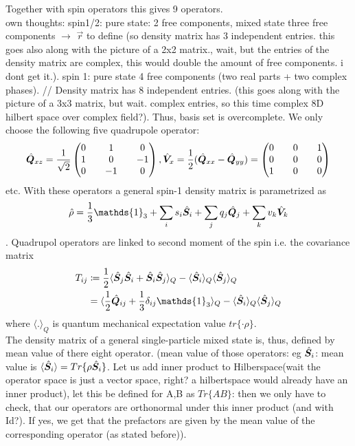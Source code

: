 Together with spin operators this gives 9 operators. 
\\
own thoughts: spin1/2: pure state: 2 free components, mixed state three free components $\rightarrow$ $\vec{r}$ to define (so density matrix has 3 independent entries. this goes also along with the picture of a 2x2 matrix., wait, but the entries of the density matrix are complex, this would double the amount of free components. i dont get it.). spin 1: pure state 4 free components (two real parts + two complex phases). 
//
Density matrix has 8 independent entries. (this goes along with the picture of a 3x3 matrix, but wait. complex entries, so this time complex 8D hilbert space over complex field?). Thus, basis set is overcomplete. We only choose the following five quadrupole operator:
\begin{equation}
	\hat{\bm{Q}}_{xz} = \frac{1}{\sqrt{2}} \left (
	\begin{matrix}
		0 && 1 && 0 
		\\
		1 && 0 && -1
		\\
		0 && -1 && 0
	\end{matrix} \right ), \hat{\bm{V}}_x = \frac{1}{2} (\hat{\bm{Q}}_{xx} - \hat{\bm{Q}}_{yy}) = \left( 
	\begin{matrix}
		0 && 0 && 1
		\\
		0 && 0 && 0
		\\
		1 && 0 && 0
	\end{matrix} \right)
\end{equation}etc.
With these operators a general spin-1 density matrix is parametrized as
\begin{equation}
	\hat{\rho} = \frac{1}{3} \mathds{1}_3 + \sum_i s_i \xo{S}_i  + \sum_j q_j \xo{Q}_j + \sum_k v_k \xo{V}_k
\end{equation}.
Quadrupol operators are linked to second moment of the spin i.e. the covariance matrix
\begin{align}
	T_{ij} &\coloneqq \frac{1}{2} \langle \xo{S}_j \xo{S}_i + \xo{S}_i \xo{S}_j \rangle_Q - \langle \xo{S}_i \rangle_Q \langle \xo{S}_j \rangle_Q
	\\ 
	&= \langle \frac{1}{2} \xo{Q}_{ij} + \frac{1}{3} \delta_{ij}  \mathds{1}_3 \rangle_Q - \langle \xo{S}_i \rangle_Q \langle \xo{S}_j \rangle_Q
\end{align}
where $\langle .  \rangle_Q $ is quantum mechanical expectation value $tr\{\cdot \rho \}$.
\\
The density matrix of a general single-particle mixed state is, thus, defined by mean value of there eight operator. (mean value of those operators: eg $\hat{\bm{S}}_i$: mean value is $ \langle\hat{\bm{S}}_i \rangle = Tr\{ \rho \hat{\bm{S}}_i \}$. Let us add inner product to Hilberspace(wait the operator space is just a vector space, right? a hilbertspace would already have an inner product), let this be defined for A,B as $Tr\{ AB\}$: then we only have to check, that our operators are orthonormal under this inner product (and with Id?). If yes, we get that the prefactors are given by the mean value of the corresponding operator (as stated before)).
